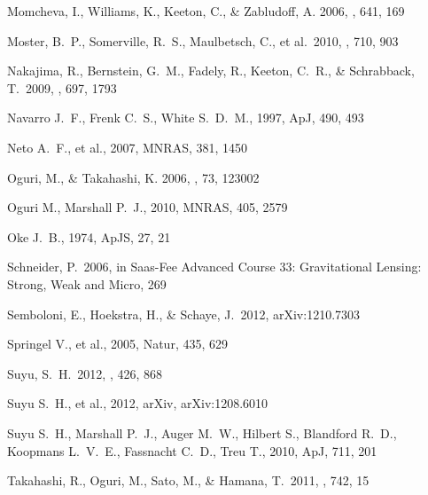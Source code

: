 \begin{thebibliography}{99}
{Momcheva}, I., {Williams}, K., {Keeton}, C., \& {Zabludoff}, A. 2006, \apj,
  641, 169


 Moster, B.~P., 
Somerville, R.~S., Maulbetsch, C., et al.\ 2010, \apj, 710, 903 


 Nakajima, R., 
Bernstein, G.~M., Fadely, R., Keeton, C.~R., 
\& Schrabback, T.\ 2009, \apj, 697, 1793 

 Navarro J.~F., Frenk C.~S., White S.~D.~M., 1997, ApJ, 490, 493 


Neto A.~F., et al., 2007, MNRAS, 381, 1450 


{Oguri}, M., \& {Takahashi}, K. 2006, \prd, 73, 123002

 Oguri M., Marshall P.~J., 2010, MNRAS, 405, 2579 


 Oke 
J.~B., 1974, ApJS, 27, 21 

 Schneider, P.\ 2006, 
in Saas-Fee Advanced Course 33: Gravitational Lensing: Strong, Weak and Micro, 
269 

 Semboloni, E., 
Hoekstra, H., \& Schaye, J.\ 2012, arXiv:1210.7303 


 Springel V., et al., 2005, Natur, 435, 629 


 Suyu, S.~H.\ 2012, \mnras, 426, 868 

Suyu S.~H., et al., 2012, arXiv, arXiv:1208.6010 


Suyu S.~H., Marshall P.~J., Auger M.~W., Hilbert S., Blandford R.~D., 
Koopmans L.~V.~E., Fassnacht C.~D., Treu T., 2010, ApJ, 711, 201 

 Takahashi, R., Oguri, 
M., Sato, M., \& Hamana, T.\ 2011, \apj, 742, 15 



\end{thebibliography}
